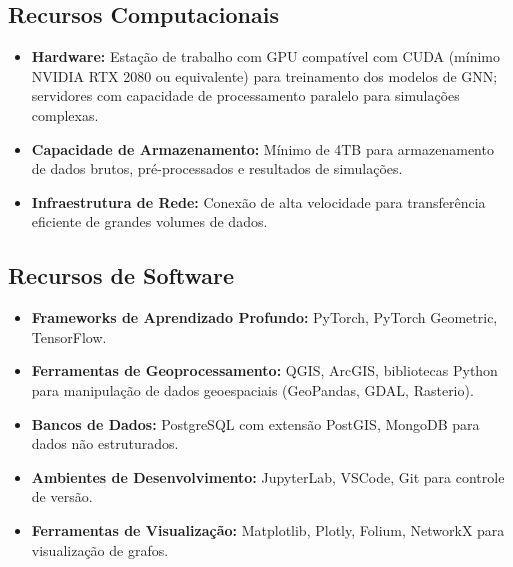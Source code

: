 \subsection{Recursos Computacionais}
\begin{itemize}[noitemsep]
    \item \textbf{Hardware:} Estação de trabalho com GPU compatível com CUDA (mínimo NVIDIA RTX 2080 ou equivalente) para treinamento dos modelos de \gls{GNN}; servidores com capacidade de processamento paralelo para simulações complexas.
    
    \item \textbf{Capacidade de Armazenamento:} Mínimo de 4TB para armazenamento de dados brutos, pré-processados e resultados de simulações.
    
    \item \textbf{Infraestrutura de Rede:} Conexão de alta velocidade para transferência eficiente de grandes volumes de dados.
\end{itemize}

\subsection{Recursos de Software}
\begin{itemize}[noitemsep]
    \item \textbf{Frameworks de Aprendizado Profundo:} PyTorch, PyTorch Geometric, TensorFlow.
    
    \item \textbf{Ferramentas de Geoprocessamento:} QGIS, ArcGIS, bibliotecas Python para manipulação de dados geoespaciais (GeoPandas, GDAL, Rasterio).
    
    \item \textbf{Bancos de Dados:} PostgreSQL com extensão PostGIS, MongoDB para dados não estruturados.
    
    \item \textbf{Ambientes de Desenvolvimento:} JupyterLab, VSCode, Git para controle de versão.
    
    \item \textbf{Ferramentas de Visualização:} Matplotlib, Plotly, Folium, NetworkX para visualização de grafos.
\end{itemize}

